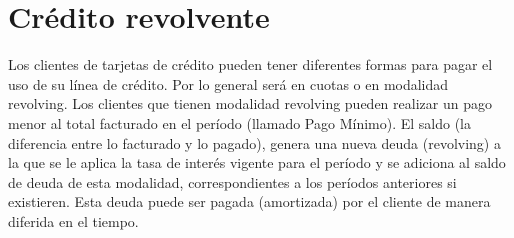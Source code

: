 \section{Crédito revolvente}

Los clientes de tarjetas de crédito pueden tener diferentes formas para pagar el uso de su línea de crédito.
Por lo general será en cuotas o en modalidad revolving. Los clientes que tienen modalidad revolving pueden 
realizar un pago menor al total facturado en el período (llamado Pago Mínimo). El saldo (la diferencia entre 
lo facturado y lo pagado), genera una nueva deuda (revolving) a la que se le aplica la tasa de interés vigente 
para el período y se adiciona al saldo de deuda de esta modalidad, correspondientes a los períodos anteriores 
si existieren. Esta deuda puede ser pagada (amortizada) por el cliente de manera diferida en el tiempo.\cite{banco1991informe}

